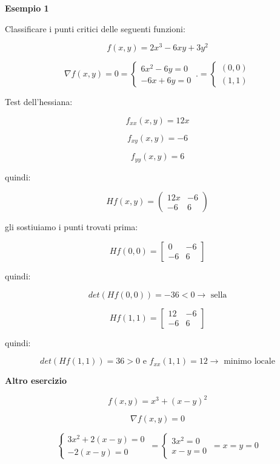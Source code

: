 \documentclass[../appunti-analisi.tex]{subfiles}
\begin{document}
\textbf{Esempio 1} 

Classificare i punti critici delle seguenti funzioni:

\[
    f(x,y) = 2x^{3}-6xy + 3y^{2}
\]

\[
    \nabla f(x,y)=0 = \begin{cases}
               6x^{2}-6y=0\\
               -6x + 6y =0
        \end{cases}\,. = \begin{cases}
        (0,0)\\
        (1,1)
        \end{cases}
\]

Test dell'hessiana:

\[
    f_{xx}(x,y) = 12x
\]

\[
    f_{xy}(x,y)= -6
\]

\[
    f_{yy}(x,y) = 6
\]

quindi:

\[
    H f(x,y) = \begin{pmatrix}
    12x & -6\\
    -6 & 6 
    \end{pmatrix}
\]

gli sostiuiamo i punti trovati prima:

\[
    Hf(0,0) = \begin{bmatrix}
    0 & -6\\
    -6 & 6
    \end{bmatrix}
\]

quindi:

\[
    det (Hf(0,0)) = -36 <0 \rightarrow \text{ sella}
\]

\[
    Hf(1,1) = \begin{bmatrix}
    12 & -6\\
    -6 & 6
    \end{bmatrix}
\]

quindi:

\[
    det (Hf(1,1)) = 36 >0 \text{ e } f_{xx}(1,1) = 12 \rightarrow \text{ minimo locale}
\]

\textbf{Altro esercizio} 

\[
    f(x,y) = x^{3} + (x-y)^{2}
\]

\[
    \nabla f(x,y)=0
\]

\[
        \begin{cases}
    3x^{2}+2(x-y) = 0\\
    -2(x-y) = 0
        \end{cases}\, = \begin{cases}
    3x^{2}= 0\\
    x-y= 0
        \end{cases}\, = x = y =0
\]
\end{document}

